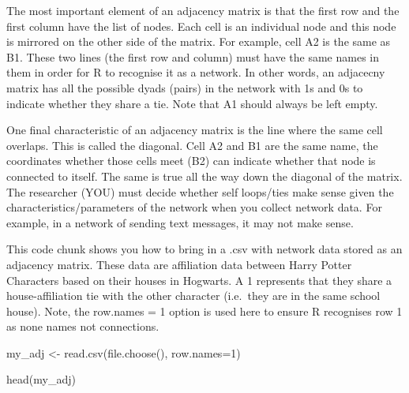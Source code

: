\documentclass[
  letterpaper,
  DIV=11,
  numbers=noendperiod]{scrreprt}
\newenvironment{Shaded}{\begin{snugshade}}{\end{snugshade}}
\newcommand{\AttributeTok}[1]{\textcolor[rgb]{0.40,0.45,0.13}{#1}}
\newcommand{\DecValTok}[1]{\textcolor[rgb]{0.68,0.00,0.00}{#1}}
\newcommand{\FunctionTok}[1]{\textcolor[rgb]{0.28,0.35,0.67}{#1}}
\newcommand{\NormalTok}[1]{\textcolor[rgb]{0.00,0.23,0.31}{#1}}
\newcommand{\OtherTok}[1]{\textcolor[rgb]{0.00,0.23,0.31}{#1}}
\begin{document}
The most important element of an adjacency matrix is that the first row
and the first column have the list of nodes. Each cell is an individual
node and this node is mirrored on the other side of the matrix. For
example, cell A2 is the same as B1. These two lines (the first row and
column) must have the same names in them in order for R to recognise it
as a network. In other words, an adjacecny matrix has all the possible
dyads (pairs) in the network with 1s and 0s to indicate whether they
share a tie. Note that A1 should always be left empty.

One final characteristic of an adjacency matrix is the line where the
same cell overlaps. This is called the diagonal. Cell A2 and B1 are the
same name, the coordinates whether those cells meet (B2) can indicate
whether that node is connected to itself. The same is true all the way
down the diagonal of the matrix. The researcher (YOU) must decide
whether self loops/ties make sense given the characteristics/parameters
of the network when you collect network data. For example, in a network
of sending text messages, it may not make sense.

This code chunk shows you how to bring in a .csv with network data
stored as an adjacency matrix. These data are affiliation data between
Harry Potter Characters based on their houses in Hogwarts. A 1
represents that they share a house-affiliation tie with the other
character (i.e.~they are in the same school house). Note, the row.names
= 1 option is used here to ensure R recognises row 1 as none names not
connections.

\begin{Shaded}
\begin{Highlighting}[]
\NormalTok{my\_adj  }\OtherTok{\textless{}{-}} \FunctionTok{read.csv}\NormalTok{(}\FunctionTok{file.choose}\NormalTok{(), }\AttributeTok{row.names=}\DecValTok{1}\NormalTok{) }

\FunctionTok{head}\NormalTok{(my\_adj)}
\end{Highlighting}
\end{Shaded}
\end{document}
